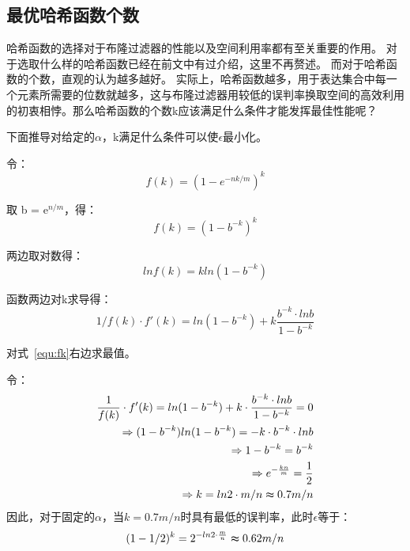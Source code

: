 \subsection{最优哈希函数个数}
\label{sec:num_hashf}
哈希函数的选择对于布隆过滤器的性能以及空间利用率都有至关重要的作用。
对于选取什么样的哈希函数已经在前文中有过介绍，这里不再赘述。
而对于哈希函数的个数，直观的认为越多越好。
实际上，哈希函数越多，用于表达集合中每一个元素所需要的位数就越多，这与布隆过滤器用较低的误判率换取空间的高效利用的初衷相悖。那么哈希函数的个数k应该满足什么条件才能发挥最佳性能呢？

下面推导对给定的$\alpha$，k满足什么条件可以使$\epsilon$最小化。

令：
\begin{equation}
f\left(k\right) = \left(1 - e^{-{nk/m}}\right)^k 
\end{equation}

取 b = e$^{n/m}$，得：
\begin{equation}
f\left(k\right) = \left(1 - b^{-k}\right)^k 
\end{equation}

两边取对数得： 
\begin{equation}
lnf\left(k\right) = kln\left(1 - b^{-k}\right)
\end{equation}

函数两边对k求导得：
\begin{equation}
{1/f(k)}\cdot f'(k) = ln(1 - b^{-k}) + k \frac{b^{-k}\cdot lnb}{1 - b^{-k}} 
\label{equ:fk}
\end{equation}

对式~\ref{equ:fk}右边求最值。

令：
\begin{equation}
\begin{split}
\frac{1}{f(k)}\cdot f'(k) = ln(1 - b^{-k}) + k\cdot \frac{b^{-k}\cdot lnb}{1 - b^{-k}} = 0 \\
\Rightarrow (1 - b^{-k}) ln(1 - b^{-k}) = -k\cdot b^{-k}\cdot lnb \\
\Rightarrow 1 - b^{-k} = b^{-k} \\
\Rightarrow e^{-\frac{kn}{m}} = \frac{1}{2}\\
\Rightarrow k = ln2\cdot {m/n} \thickapprox 0.7{m/n}
\end{split}
\end{equation}
因此，对于固定的$\alpha$，当$k = 0.7{m/n}$时具有最低的误判率，此时$\epsilon$等于：
\begin{equation}
(1 - {1/2})^k = 2^{-ln2\cdot\frac{m}{n}} \thickapprox 0.62{m/n}
\end{equation}

